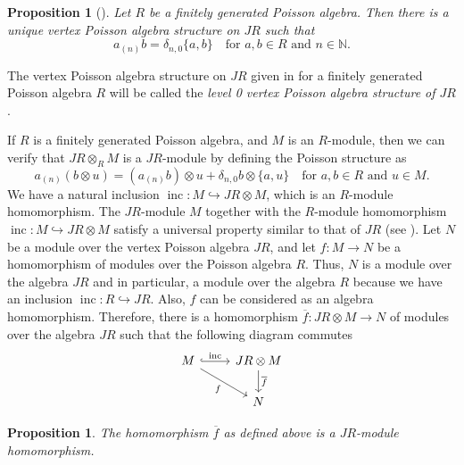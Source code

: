 \documentclass[a4paper, 12pt, reqno]{amsart}
\newtheorem{proposition}[theorem]{Proposition}
\theoremstyle{remark}
\DeclareMathOperator{\inc}{inc}
\begin{document}
\begin{proposition}[{\cite[Proposition 2.3.1]{arakawa_remark_2012}}]
  \label{prp:11}
  Let $R$ be a finitely generated Poisson algebra.
  Then there is a unique vertex Poisson algebra structure on $JR$ such that
  \begin{equation*}
    a_{(n)}b = \delta_{n, 0}\{a, b\} \quad \text{for $a, b \in R$ and $n \in \mathbb{N}$}.
  \end{equation*}
\end{proposition}

The vertex Poisson algebra structure on $JR$ given in  for a finitely generated Poisson algebra $R$ will be called the \emph{level 0 vertex Poisson algebra structure of $JR$}.

If $R$ is a finitely generated Poisson algebra, and $M$ is an $R$-module, then we can verify that $JR \otimes_{R} M$ is a $JR$-module by defining the Poisson structure as
\begin{equation*}
  a_{(n)}(b\otimes u) = (a_{(n)}b)\otimes u + \delta_{n, 0}b\otimes\{a, u\} \quad \text{for $a, b \in R$ and $u \in M$}.
\end{equation*}
We have a natural inclusion $\inc: M \hookrightarrow JR \otimes M$, which is an $R$-module homomorphism.
The $JR$-module $M$ together with the $R$-module homomorphism $\inc: M \hookrightarrow JR \otimes M$ satisfy a universal property similar to that of $JR$ (see ).
Let $N$ be a module over the vertex Poisson algebra $JR$, and let $f: M \to N$ be a homomorphism of modules over the Poisson algebra $R$.
Thus, $N$ is a module over the algebra $JR$ and in particular, a module over the algebra $R$ because we have an inclusion $\inc: R \hookrightarrow JR$.
Also, $f$ can be considered as an algebra homomorphism.
Therefore, there is a homomorphism $\overline{f}: JR \otimes M \to N$ of modules over the algebra $JR$ such that the following diagram commutes
\begin{equation*}
  \begin{tikzcd}
    M \arrow[r, "\inc", hook] \arrow[rd, "f"'] & JR \otimes M \arrow[d, "\overline{f}"] \\
    & N
  \end{tikzcd}
\end{equation*}

\begin{proposition}
  \label{prp:12}
  The homomorphism $\overline{f}$ as defined above is a $JR$-module homomorphism.
\end{proposition}
\end{document}
